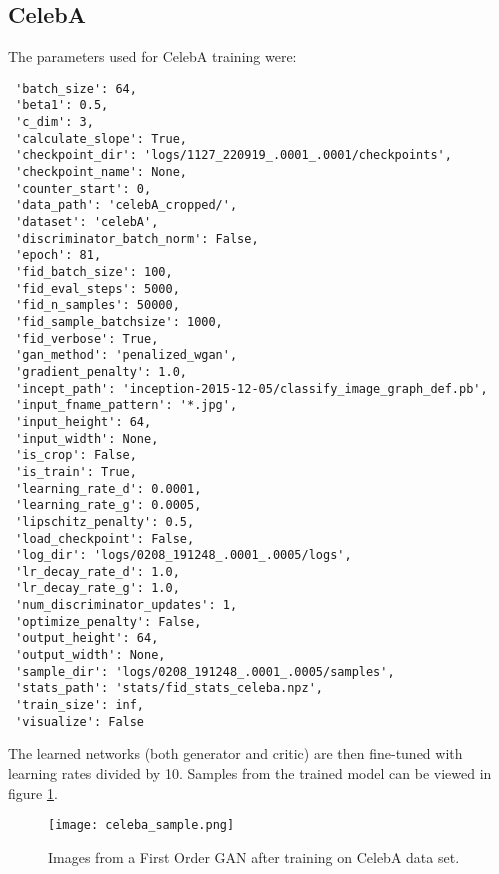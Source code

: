 \documentclass{article}
\begin{document}
 \subsection{CelebA}\label{SS:appendix_celeba_words}
 The parameters used for CelebA training were:
 \begin{verbatim}
 'batch_size': 64,
 'beta1': 0.5,
 'c_dim': 3,
 'calculate_slope': True,
 'checkpoint_dir': 'logs/1127_220919_.0001_.0001/checkpoints',
 'checkpoint_name': None,
 'counter_start': 0,
 'data_path': 'celebA_cropped/',
 'dataset': 'celebA',
 'discriminator_batch_norm': False,
 'epoch': 81,
 'fid_batch_size': 100,
 'fid_eval_steps': 5000,
 'fid_n_samples': 50000,
 'fid_sample_batchsize': 1000,
 'fid_verbose': True,
 'gan_method': 'penalized_wgan',
 'gradient_penalty': 1.0,
 'incept_path': 'inception-2015-12-05/classify_image_graph_def.pb',
 'input_fname_pattern': '*.jpg',
 'input_height': 64,
 'input_width': None,
 'is_crop': False,
 'is_train': True,
 'learning_rate_d': 0.0001,
 'learning_rate_g': 0.0005,
 'lipschitz_penalty': 0.5,
 'load_checkpoint': False,
 'log_dir': 'logs/0208_191248_.0001_.0005/logs',
 'lr_decay_rate_d': 1.0,
 'lr_decay_rate_g': 1.0,
 'num_discriminator_updates': 1,
 'optimize_penalty': False,
 'output_height': 64,
 'output_width': None,
 'sample_dir': 'logs/0208_191248_.0001_.0005/samples',
 'stats_path': 'stats/fid_stats_celeba.npz',
 'train_size': inf,
 'visualize': False
 \end{verbatim}
 The learned networks (both generator and critic) are then fine-tuned with learning rates divided by 10.
 Samples from the trained model can be viewed in figure \ref{F:fogan_faces}.
 \begin{figure}
  \centering
  \texttt{[image: celeba\_sample.png]}
  \caption{Images from a First Order GAN after training on CelebA data set.}\label{F:fogan_faces}
 \end{figure}
\clearpage
\end{document}
